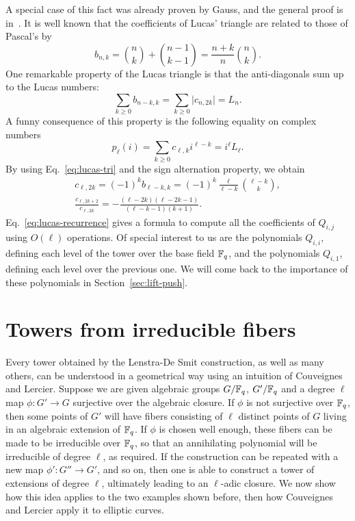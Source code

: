 \documentclass{sig-alternate}
\begin{document}
A special case of this fact was already proven by Gauss, and the
general proof is in~\cite[Proposition~1]{gurak06}.  It is well known
that the coefficients of Lucas' triangle are related to those of
Pascal's by
\begin{equation}
  \label{eq:lucas-tri}
  b_{n,k} = \binom{n}{k} + \binom{n-1}{k-1} = \frac{n+k}{n}\binom{n}{k}.
\end{equation}
One remarkable property of the Lucas triangle is that the
anti-diagonals sum up to the Lucas numbers:
\begin{equation}
  \sum_{k\ge0} b_{n-k,k} = \sum_{k\ge0} \lvert c_{n,2k}\rvert = L_n.
\end{equation}
A funny consequence of this property is the following equality on
complex numbers
\begin{equation}
  \label{eq:lucas-fun}
  p_\ell(i) = \sum_{k\ge0} c_{\ell,k}i^{\ell-k} = i^\ell L_\ell.
\end{equation}
By using Eq.~\eqref{eq:lucas-tri} and the sign alternation property,
we obtain 
\begin{gather}
  c_{\ell,2k} = (-1)^kb_{\ell-k,k} = (-1)^k\frac{\ell}{\ell-k}\binom{\ell-k}{k},\\
  \label{eq:lucas-recurrence}
  \frac{c_{\ell,2k+2}}{c_{\ell,2k}} = 
  -\frac{(\ell-2k)(\ell-2k-1)}{(\ell-k-1)(k+1)}.
\end{gather}
Eq.~\eqref{eq:lucas-recurrence} gives a formula to compute all the
coefficients of $Q_{i,j}$ using $O(\ell)$ operations. Of special
interest to us are the polynomials $Q_{i,i}$, defining each level of
the tower over the base field $\mathbb{F}_q$, and the polynomials $Q_{i,1}$,
defining each level over the previous one. We will come back to the
importance of these polynomials in Section~\ref{sec:lift-push}.



\section{Towers from irreducible fibers}
\label{sec:fibers}
Every tower obtained by the Lenstra-De Smit construction, as well as
many others, can be understood in a geometrical way using an intuition
of Couveignes and Lercier\cite{couveignes+lercier11}. Suppose we are
given algebraic groups $G/\mathbb{F}_q$, $G'/\mathbb{F}_q$ and a degree $\ell$ map
$\phi:G'\to G$ surjective over the algebraic closure. If $\phi$ is not
surjective over $\mathbb{F}_q$, then some points of $G'$ will have fibers
consisting of $\ell$ distinct points of $G$ living in an algebraic
extension of $\mathbb{F}_q$. If $\phi$ is chosen well enough, these fibers can
be made to be irreducible over $\mathbb{F}_q$, so that an annihilating
polynomial will be irreducible of degree $\ell$, as required. If the
construction can be repeated with a new map $\phi':G''\to G'$, and so
on, then one is able to construct a tower of extensions of degree
$\ell$, ultimately leading to an $\ell$-adic closure. We now show how
this idea applies to the two examples shown before, then how
Couveignes and Lercier apply it to elliptic curves.
\end{document}
